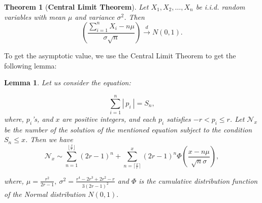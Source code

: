 \documentclass[11pt]{amsart}
\numberwithin{equation}{section}
\newtheorem{lemma}[theorem]{Lemma}
\newtheorem{thm}[theorem]{Theorem}
\newcommand{\tb}{\textbf}
\numberwithin{equation}{section}
\begin{document}
		 \begin{thm}[\tb{Central Limit Theorem}]
		 	Let \( X_1, X_2, \dots, X_n \) be i.i.d. random variables with mean \( \mu \) and variance \( \sigma^2 \). Then
		 	\[
		 	 \left( \frac{\sum_{i=1}^n X_i-n \mu}{\sigma\sqrt{n}} \right) \xrightarrow{d} {N}(0, 1).
		 	\]
		 \end{thm}
		  
		 
		 
		 
		 
		 
		 To get the asymptotic value, we use the Central Limit Theorem to get the following lemma: 		\begin{lemma}\label{even}
		 	Let us consider the equation:
		 	
		 	
		 	\begin{equation}
		 		\sum_{i=1}^{n} |~p_{i}~|=S_{n}, 
		 	\end{equation}
		 	where, $p_{i}$'s, and $x$ are positive integers, and each $p_{i}$  satisfies \( -r < p_i \leq r \). Let $\mathcal{N}_x$ be the number of the solution of the mentioned equation subject to the condition $S_n \leq x$. Then we have  \[ \mathcal{N}_{x}\sim \sum_{n=1}^{\lfloor \frac{x}{r}\rfloor}(2r-1)^{n}+{\sum_{n=\lceil \frac{x}{r}\rceil}^{x}(2r-1)^{n}\Phi\left(\frac{x-n\mu}{\sqrt{n}\sigma}\right)},  \]
		 	
		 	where, ${\mu=\frac{r^{2}}{2r-1}}, ~\sigma^{2}=\frac{r^4 - 2r^3 + 2r^2 - r}{3(2r - 1)^2}$ and $\Phi$ is the cumulative distribution function of the Normal distribution $N(0,1).$
		 \end{lemma}
		 
		 
		 
\end{document}
